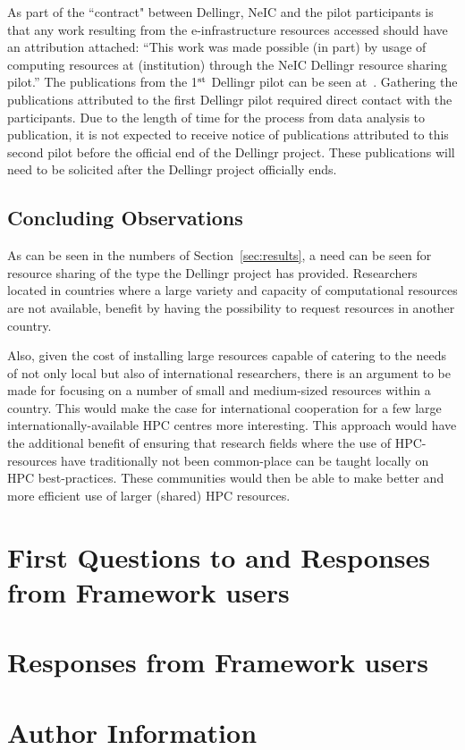 \documentclass{article}
\newcommand{\dell}{Dellingr\xspace}
\newcommand{\einfra}{e-infrastructure\xspace}
\begin{document}
As part of the ``contract" between \dell, NeIC and the pilot participants is that any work resulting from the \einfra resources accessed should have an attribution attached: 
``This work was made possible (in part) by usage of computing resources at (institution) through the NeIC Dellingr resource sharing pilot.''
The publications from the 1$^{\rm st}$ \dell pilot can be seen at~\cite{pilot-pubs}.
Gathering the publications attributed to the first \dell pilot required direct contact with the participants.
Due to the length of time for the process from data analysis to publication, it is not expected to receive notice of publications attributed to this second pilot before the official end of the \dell project.
These publications will need to be solicited after the \dell project officially ends.

\subsection{Concluding Observations}
\label{ssec:obs}

As can be seen in the numbers of Section~\ref{sec:results}, a need can be seen for resource sharing of the type the \dell project has provided.
Researchers located in countries where a large variety and capacity of computational resources are not available, benefit by having the possibility to request resources in another country.

Also, given the cost of installing large resources capable of catering to the needs of not only local but also of international researchers, there is an argument to be made for focusing on a number of small and medium-sized resources within a country.
This would make the case for international cooperation for a few large 
internationally-available HPC centres more interesting.
This approach would have the additional benefit of ensuring that research fields where the use of HPC-resources have traditionally not been common-place can be taught locally on HPC best-practices.
These communities would then be able to make better and more efficient use of larger (shared) HPC resources.

\newpage
{}


\newpage
\begin{appendices}

\section{First Questions to and Responses from Framework users}
\label{app:first-questions}


\newpage
\section{Responses from Framework users}
\label{app:answers}


\newpage
\section{Author Information}
\label{app:authors}


\end{appendices}
\end{document}
